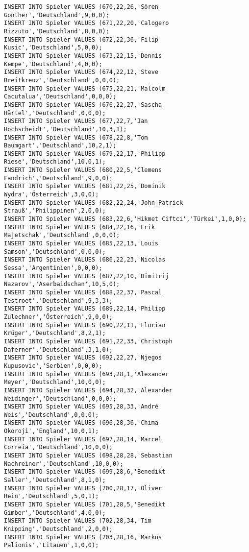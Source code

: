 \documentclass{lehramt-informatik-aufgabe}
\begin{document}
\begin{verbatim}
INSERT INTO Spieler VALUES (670,22,26,'Sören Gonther','Deutschland',9,0,0);
INSERT INTO Spieler VALUES (671,22,20,'Calogero Rizzuto','Deutschland',8,0,0);
INSERT INTO Spieler VALUES (672,22,36,'Filip Kusic','Deutschland',5,0,0);
INSERT INTO Spieler VALUES (673,22,15,'Dennis Kempe','Deutschland',4,0,0);
INSERT INTO Spieler VALUES (674,22,12,'Steve Breitkreuz','Deutschland',0,0,0);
INSERT INTO Spieler VALUES (675,22,21,'Malcolm Cacutalua','Deutschland',0,0,0);
INSERT INTO Spieler VALUES (676,22,27,'Sascha Härtel','Deutschland',0,0,0);
INSERT INTO Spieler VALUES (677,22,7,'Jan Hochscheidt','Deutschland',10,3,1);
INSERT INTO Spieler VALUES (678,22,8,'Tom Baumgart','Deutschland',10,2,1);
INSERT INTO Spieler VALUES (679,22,17,'Philipp Riese','Deutschland',10,0,1);
INSERT INTO Spieler VALUES (680,22,5,'Clemens Fandrich','Deutschland',9,0,0);
INSERT INTO Spieler VALUES (681,22,25,'Dominik Wydra','Österreich',3,0,0);
INSERT INTO Spieler VALUES (682,22,24,'John-Patrick Strauß','Philippinen',2,0,0);
INSERT INTO Spieler VALUES (683,22,6,'Hikmet Ciftci','Türkei',1,0,0);
INSERT INTO Spieler VALUES (684,22,16,'Erik Majetschak','Deutschland',0,0,0);
INSERT INTO Spieler VALUES (685,22,13,'Louis Samson','Deutschland',0,0,0);
INSERT INTO Spieler VALUES (686,22,23,'Nicolas Sessa','Argentinien',0,0,0);
INSERT INTO Spieler VALUES (687,22,10,'Dimitrij Nazarov','Aserbaidschan',10,5,0);
INSERT INTO Spieler VALUES (688,22,37,'Pascal Testroet','Deutschland',9,3,3);
INSERT INTO Spieler VALUES (689,22,14,'Philipp Zulechner','Österreich',9,0,0);
INSERT INTO Spieler VALUES (690,22,11,'Florian Krüger','Deutschland',8,2,1);
INSERT INTO Spieler VALUES (691,22,33,'Christoph Daferner','Deutschland',3,1,0);
INSERT INTO Spieler VALUES (692,22,27,'Njegos Kupusovic','Serbien',0,0,0);
INSERT INTO Spieler VALUES (693,28,1,'Alexander Meyer','Deutschland',10,0,0);
INSERT INTO Spieler VALUES (694,28,32,'Alexander Weidinger','Deutschland',0,0,0);
INSERT INTO Spieler VALUES (695,28,33,'André Weis','Deutschland',0,0,0);
INSERT INTO Spieler VALUES (696,28,36,'Chima Okoroji','England',10,0,1);
INSERT INTO Spieler VALUES (697,28,14,'Marcel Correia','Deutschland',10,0,0);
INSERT INTO Spieler VALUES (698,28,28,'Sebastian Nachreiner','Deutschland',10,0,0);
INSERT INTO Spieler VALUES (699,28,6,'Benedikt Saller','Deutschland',8,1,0);
INSERT INTO Spieler VALUES (700,28,17,'Oliver Hein','Deutschland',5,0,1);
INSERT INTO Spieler VALUES (701,28,5,'Benedikt Gimber','Deutschland',4,0,0);
INSERT INTO Spieler VALUES (702,28,34,'Tim Knipping','Deutschland',2,0,0);
INSERT INTO Spieler VALUES (703,28,16,'Markus Palionis','Litauen',1,0,0);

\end{verbatim}
\end{document}
